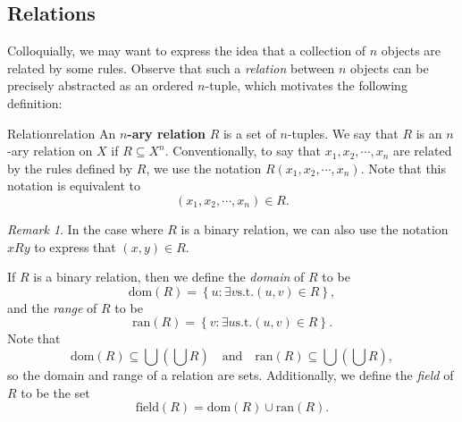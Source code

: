\documentclass[math]{amznotes}
\theoremstyle{remark}
\newtheorem*{remark}{Remark}
\begin{document}
\subsection{Relations}
Colloquially, we may want to express the idea that a collection of $n$ objects are related by some rules. Observe that such a \textit{relation} between $n$ objects can be precisely abstracted as an ordered $n$-tuple, which motivates the following definition:
\begin{dfnbox}{Relation}{relation}
    An {\color{red} \textbf{$n$-ary relation}} $R$ is a set of $n$-tuples. We say that $R$ is an $n$-ary relation on $X$ if $R \subseteq X^n$. Conventionally, to say that $x_1, x_2, \cdots, x_n$ are related by the rules defined by $R$, we use the notation $R(x_1, x_2, \cdots, x_n)$. Note that this notation is equivalent to 
    \begin{displaymath}
        (x_1, x_2, \cdots, x_n) \in R.
    \end{displaymath}
\end{dfnbox}
\begin{notebox}
    \begin{remark}
        In the case where $R$ is a binary relation, we can also use the notation $xRy$ to express that $(x, y) \in R$.
    \end{remark}
\end{notebox}
If $R$ is a binary relation, then we define the \textit{domain} of $R$ to be
\begin{displaymath}
    \mathrm{dom}(R) = \left\{u \colon \exists v \textrm{s.t.} (u, v) \in R\right\},
\end{displaymath}
and the \textit{range} of $R$ to be
\begin{displaymath}
    \mathrm{ran}(R) = \left\{v \colon \exists u \textrm{s.t.} (u, v) \in R\right\}.
\end{displaymath}
Note that
\begin{displaymath}
    \mathrm{dom}(R) \subseteq \bigcup \left(\bigcup R\right) \quad \textrm{and} \quad \mathrm{ran}(R) \subseteq \bigcup \left(\bigcup R\right),
\end{displaymath}
so the domain and range of a relation are sets. Additionally, we define the \textit{field} of $R$ to be the set
\begin{displaymath}
    \mathrm{field}(R) = \mathrm{dom}(R) \cup \mathrm{ran}(R).
\end{displaymath}
\end{document}
